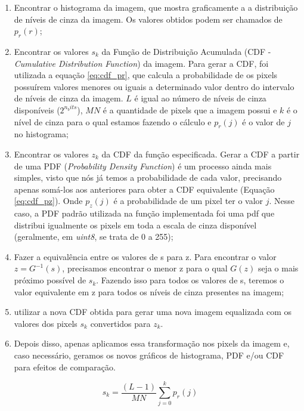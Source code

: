 \documentclass{article}
\begin{document}
\begin{enumerate}
	\item Encontrar o histograma da imagem, que mostra graficamente a a distribuição de níveis de cinza da imagem. Os valores obtidos podem ser chamados de $p_r(r)$;
	
	\item Encontrar os valores $s_k$ da Função de Distribuição Acumulada (CDF - \textit{Cumulative Distribution Function}) da imagem. Para gerar a CDF, foi utilizada a equação \ref{eq:cdf_pr}, que calcula a probabilidade de os pixels possuírem valores menores ou iguais a determinado valor dentro do intervalo de níveis de cinza da imagem. $L$ é igual ao número de níveis de cinza disponíveis ($2^{n_bits}$), $MN$ é a quantidade de pixels que a imagem possui e $k$ é o nível de cinza para o qual estamos fazendo o cálculo e $p_r(j)$ é o valor de $j$ no histograma;
	
	\item Encontrar os valores $z_k$ da CDF da função especificada. Gerar a CDF a partir de uma PDF (\textit{Probability Density Function}) é um processo ainda mais simples, visto que nós já temos a probabilidade de cada valor, precisando apenas somá-los aos anteriores para obter a CDF equivalente (Equação \ref{eq:cdf_pz}). Onde $p_z(j)$ é a probabilidade de um pixel ter o valor $j$. Nesse caso, a PDF padrão utilizada na função implementada foi uma pdf que distribui igualmente os pixels em toda a escala de cinza disponível (geralmente, em \textit{uint8}, se trata de 0 a 255);
	
	\item Fazer a equivalência entre os valores de s para z. Para encontrar o valor $z = G^{-1}(s)$, precisamos encontrar o menor z para o qual $G(z)$ seja o mais próximo possível de $s_k$.
	Fazendo isso para todos os valores de s, teremos o valor equivalente em z para todos os níveis de cinza presentes na imagem;
	
	\item utilizar a nova CDF obtida para gerar uma nova imagem equalizada com os valores dos pixels $s_k$ convertidos para $z_k$.
	
	\item Depois disso, apenas aplicamos essa transformação nos pixels da imagem e, caso necessário, geramos os novos gráficos de histograma, PDF e/ou CDF para efeitos de comparação.
\end{enumerate}

\begin{equation}
\label{eq:cdf_pr}
s_k = \frac{(L - 1)}{MN}\sum_{j = 0}^{k} p_r(j)
\end{equation}
\end{document}
